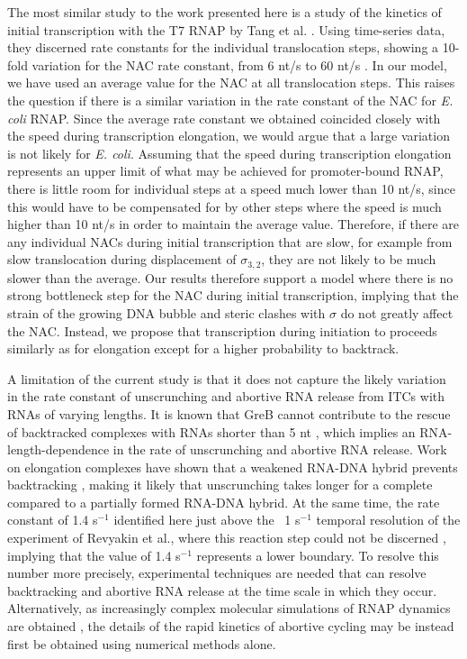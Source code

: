 The most similar study to the work presented here is a study of the kinetics
of initial transcription with the T7 RNAP by Tang et al.
\cite{tang_real-time_2009}. Using time-series data, they discerned rate
constants for the individual translocation steps, showing a 10-fold variation
for the NAC rate constant, from 6 nt/s to 60 nt/s
\cite{tang_real-time_2009}. In our model, we have used an average value for
the NAC at all translocation steps. This raises the question if there is a
similar variation in the rate constant of the NAC for \textit{E. coli} RNAP.
Since the average rate constant we obtained coincided closely with the speed
during transcription elongation, we would argue that a large variation is
not likely for \textit{E. coli}. Assuming that the speed during transcription
elongation represents an upper limit of what may be achieved for
promoter-bound RNAP, there is little room for individual steps at a speed much
lower than 10 nt/s, since this would have to be compensated for by other
steps where the speed is much higher than 10 nt/s in order to maintain the
average value. Therefore, if there are any individual NACs during initial
transcription that are slow, for example from slow translocation during
displacement of $\sigma_{3,2}$, they are not likely to be much slower than the
average. Our results therefore support a model where there is no strong
bottleneck step for the NAC during initial transcription, implying that the
strain of the growing DNA bubble and steric clashes with $\sigma$ do not
greatly affect the NAC. Instead, we propose that transcription during
initiation to proceeds similarly as for elongation except for a higher
probability to backtrack.

A limitation of the current study is that it does not capture the likely
variation in the rate constant of unscrunching and abortive RNA release from
ITCs with RNAs of varying lengths. It is known that GreB cannot
contribute to the rescue of backtracked complexes with RNAs shorter than 5 nt
\cite{hsu_initial_2006}, which implies an RNA-length-dependence in the rate of
unscrunching and abortive RNA release. Work on elongation complexes have shown
that a weakened RNA-DNA hybrid prevents backtracking
\cite{nudler_rnadna_1997}, making it likely that unscrunching takes longer for
a complete compared to a partially formed RNA-DNA hybrid. At the same time,
the rate constant of 1.4 s$^{-1}$ identified here just above the ~1 s$^{-1}$
temporal resolution of the experiment of Revyakin et al., where this reaction
step could not be discerned \cite{revyakin_abortive_2006}, implying that the
value of 1.4 s$^{-1}$ represents a lower boundary. To resolve this number more
precisely, experimental techniques are needed that can resolve backtracking
and abortive RNA release at the time scale in which they occur. Alternatively,
as increasingly complex molecular simulations of RNAP dynamics are obtained
\cite{silva_millisecond_2014}, the details of the rapid kinetics of abortive
cycling may be instead first be obtained using numerical methods alone.

